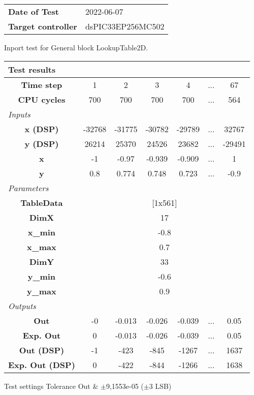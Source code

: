 \begin{tabular}{l l}
\textbf{Date of Test} & 2022-06-07 \tabularnewline
\textbf{Target controller} & dsPIC33EP256MC502 \tabularnewline
\end{tabular}
\vspace{1ex}
Inport test for General block LookupTable2D.

\vspace{1em}
\begin{tabularx}{\textwidth}{|c|c|c|c|c|>{\centering\arraybackslash}X|c|}
\hline
\multicolumn{7}{|l|}{\cellcolor[gray]{0.8}\textbf{Test results}} \tabularnewline \hline
\textbf{Time step} & 1 & 2 & 3 & 4 & ... & 67 \tabularnewline \hline
\textbf{CPU cycles} & 700 & 700 & 700 & 700 & ... & 564 \tabularnewline \hline
\multicolumn{7}{|l|}{\cellcolor[gray]{0.9}\textit{Inputs}} \tabularnewline \hline
\textbf{x (DSP)} & -32768 & -31775 & -30782 & -29789 & ... & 32767 \tabularnewline \hline
\textbf{y (DSP)} & 26214 & 25370 & 24526 & 23682 & ... & -29491 \tabularnewline \hline
\textbf{x} & -1 & -0.97 & -0.939 & -0.909 & ... & 1 \tabularnewline \hline
\textbf{y} & 0.8 & 0.774 & 0.748 & 0.723 & ... & -0.9 \tabularnewline \hline
\multicolumn{7}{|l|}{\cellcolor[gray]{0.9}\textit{Parameters}} \tabularnewline \hline
\textbf{TableData} & \multicolumn{6}{c|}{[1x561]} \tabularnewline \hline
\textbf{DimX} & \multicolumn{6}{c|}{17} \tabularnewline \hline
\textbf{x\_min} & \multicolumn{6}{c|}{-0.8} \tabularnewline \hline
\textbf{x\_max} & \multicolumn{6}{c|}{0.7} \tabularnewline \hline
\textbf{DimY} & \multicolumn{6}{c|}{33} \tabularnewline \hline
\textbf{y\_min} & \multicolumn{6}{c|}{-0.6} \tabularnewline \hline
\textbf{y\_max} & \multicolumn{6}{c|}{0.9} \tabularnewline \hline
\multicolumn{7}{|l|}{\cellcolor[gray]{0.9}\textit{Outputs}} \tabularnewline \hline
\textbf{Out} & -0 & -0.013 & -0.026 & -0.039 & ... & 0.05 \tabularnewline \hline
\textbf{Exp. Out} & 0 & -0.013 & -0.026 & -0.039 & ... & 0.05 \tabularnewline \hline
\textbf{Out (DSP)} & -1 & -423 & -845 & -1267 & ... & 1637 \tabularnewline \hline
\textbf{Exp. Out (DSP)} & 0 & -422 & -844 & -1266 & ... & 1638 \tabularnewline \hline
\end{tabularx}
\vspace{1ex}

\begin{XtoCtabular}{Test settings}
Tolerance Out & $\pm$9,1553e-05 ($\pm$3 LSB) \tabularnewline \hline
\end{XtoCtabular}

